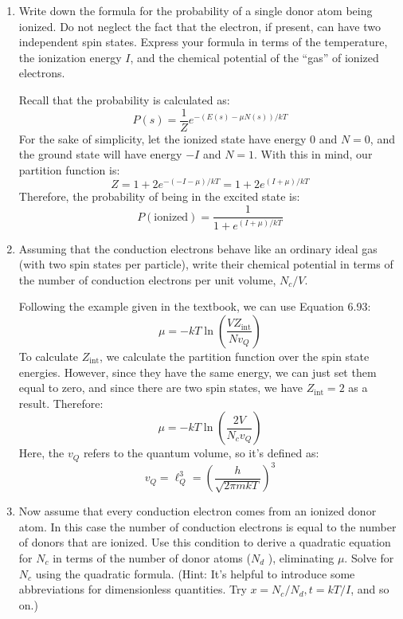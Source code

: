 \documentclass[10pt]{article}
\begin{document}
	\begin{enumerate}[label=\alph*)]
		\item Write down the formula for the probability of a single donor atom being ionized. Do not 
			neglect the fact that the electron, if present, can have two independent spin states. Express
			your formula in terms of the temperature, the ionization energy \(I\), and the chemical potential 
			of the ``gas'' of ionized electrons.

			\begin{solution}
				Recall that the probability is calculated as: 
				\[
				P(s) = \frac{1}{Z} e^{-(E(s) - \mu N(s)) / kT}
				\] 
				For the sake of simplicity, let the ionized state have energy 0 and \( N = 0 \), and the 
				ground state will have energy  \( -I \) and \( N = 1 \). With this in mind, our partition 
				function is:
				\[
					Z = 1 + 2e^{-(-I - \mu) / kT} = 1 + 2e^{(I + \mu) / kT}
				\] 
				Therefore, the probability of being in the excited state is:
				\[
				P(\text{ionized}) = \frac{1}{1 + e^{(I + \mu) / kT}}
				\] 
			\end{solution}
		\item Assuming that the conduction electrons behave like an ordinary ideal gas (with two spin 
			states per particle), write their chemical potential in terms of the number of conduction 
			electrons per unit volume, \(N_c / V\).

			\begin{solution}
				Following the example given in the textbook, we can use Equation 6.93:
				\[
				\mu = -kT \ln \left( \frac{VZ_\text{int}}{Nv_Q} \right) 
				\] 
				To calculate \( Z_\text{int} \), we calculate the partition function over the spin state energies.
				However, since they have the same energy, we can just set them equal to zero, and since 
				there are two spin states, we have \( Z_\text{int} = 2 \) as a result. Therefore:
				\[
					\mu = -kT \ln \left( \frac{2V}{N_c v_Q}\right) 	
				\] 
				Here, the \( v_Q \) refers to the quantum volume, so it's defined as:
				\[
				v_Q = \ell_Q^3 = \left( \frac{h}{\sqrt{2 \pi m kT} } \right)^3
				\] 
			\end{solution}
		\item Now assume that every conduction electron comes from an ionized donor atom. In this case the 
			number of conduction electrons is equal to the number of donors that are ionized. Use this condition 
			to derive a quadratic equation for \(N_c\) in terms of the number of donor atoms (\(N_d\) ), 
			eliminating \(\mu\). Solve for \(N_c\) using the quadratic formula. (Hint: It's helpful to 
			introduce some abbreviations for dimensionless quantities. Try \(x = N_c / N_d, t = kT / I\), and 
			so on.) 


\end{enumerate}
\end{document}
